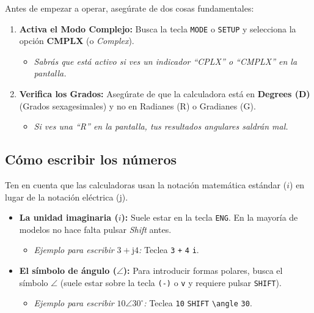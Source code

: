 \documentclass[
  a4paper,
  DIV=11,
  numbers=noendperiod]{scrreprt}
\providecommand{\tightlist}{%
  \setlength{\itemsep}{0pt}\setlength{\parskip}{0pt}}
\begin{document}
Antes de empezar a operar, asegúrate de dos cosas fundamentales:

\begin{enumerate}
\def\labelenumi{\arabic{enumi}.}
\tightlist
\item
  \textbf{Activa el Modo Complejo:} Busca la tecla \texttt{MODE} o
  \texttt{SETUP} y selecciona la opción \textbf{CMPLX} (o
  \emph{Complex}).

  \begin{itemize}
  \tightlist
  \item
    \emph{Sabrás que está activo si ves un indicador ``CPLX'' o
    ``CMPLX'' en la pantalla.}
  \end{itemize}
\item
  \textbf{Verifica los Grados:} Asegúrate de que la calculadora está en
  \textbf{Degrees (D)} (Grados sexagesimales) y no en Radianes (R) o
  Gradianes (G).

  \begin{itemize}
  \tightlist
  \item
    \emph{Si ves una ``R'' en la pantalla, tus resultados angulares
    saldrán mal.}
  \end{itemize}
\end{enumerate}

\subsection{Cómo escribir los
números}\label{cuxf3mo-escribir-los-nuxfameros}

Ten en cuenta que las calculadoras usan la notación matemática estándar
(\(i\)) en lugar de la notación eléctrica (\(\mathrm{j}\)).

\begin{itemize}
\tightlist
\item
  \textbf{La unidad imaginaria (\(i\)):} Suele estar en la tecla
  \texttt{ENG}. En la mayoría de modelos no hace falta pulsar
  \emph{Shift} antes.

  \begin{itemize}
  \tightlist
  \item
    \emph{Ejemplo para escribir \(3 + \mathrm{j}4\):} Teclea \texttt{3}
    \texttt{+} \texttt{4} \texttt{i}.
  \end{itemize}
\item
  \textbf{El símbolo de ángulo (\(\angle\)):} Para introducir formas
  polares, busca el símbolo \(\angle\) (suele estar sobre la tecla
  \texttt{(-)} o \texttt{v} y requiere pulsar \texttt{SHIFT}).

  \begin{itemize}
  \tightlist
  \item
    \emph{Ejemplo para escribir \(10 \angle 30^\circ\):} Teclea
    \texttt{10} \texttt{SHIFT} \texttt{\textbackslash{}angle}
    \texttt{30}.
  \end{itemize}
\end{itemize}
\end{document}
